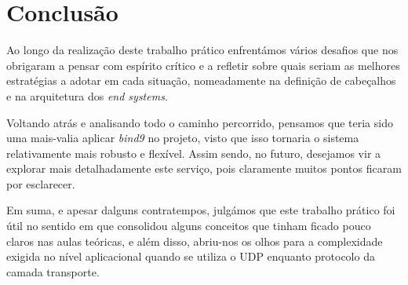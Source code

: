 \section{Conclusão}

    Ao longo da realização deste trabalho prático enfrentámos vários desafios que nos obrigaram a pensar com espírito crítico e a refletir sobre quais seriam as melhores estratégias a adotar em cada situação, nomeadamente na definição de cabeçalhos e na arquitetura dos \textit{end systems}.

    Voltando atrás e analisando todo o caminho percorrido, pensamos que teria sido uma mais-valia aplicar \textit{bind9} no projeto, visto que isso tornaria o sistema relativamente mais robusto e flexível. Assim sendo, no futuro, desejamos vir a explorar mais detalhadamente este serviço, pois claramente muitos pontos ficaram por esclarecer. 

    Em suma, e apesar dalguns contratempos, julgámos que este trabalho prático foi útil no sentido em que consolidou alguns conceitos que tinham ficado pouco claros nas aulas teóricas, e além disso, abriu-nos os olhos para a complexidade exigida no nível aplicacional quando se utiliza o UDP enquanto protocolo da camada transporte.